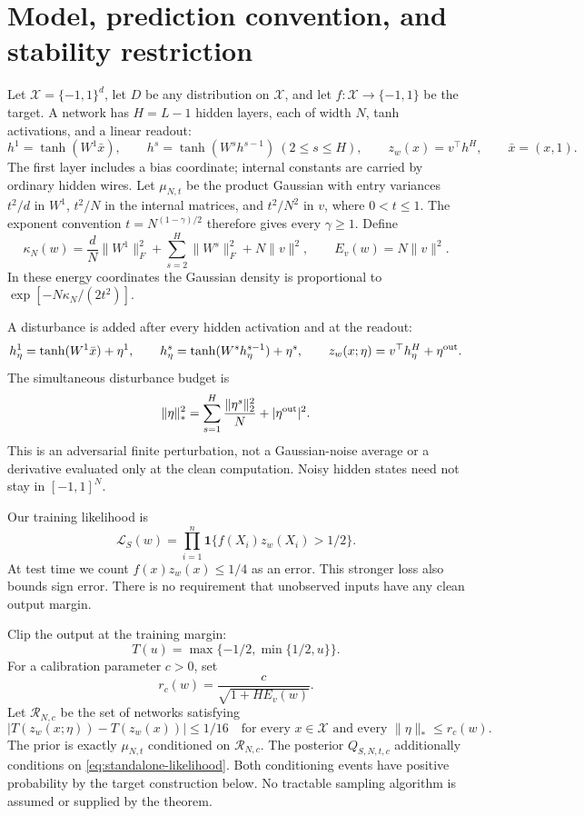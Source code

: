 \section{Model, prediction convention, and stability restriction}
\label{sec:theory-model}

Let $\mathcal X=\{-1,1\}^d$, let $D$ be any distribution on $\mathcal X$,
and let $f:\mathcal X\to\{-1,1\}$ be the target. A network has $H=L-1$
hidden layers, each of width $N$, tanh activations, and a linear readout:
\[
 h^1=\tanh(W^1\bar x),\qquad
 h^s=\tanh(W^s h^{s-1})\ (2\le s\le H),\qquad
 z_w(x)=v^\top h^H,
 \qquad \bar x=(x,1).
\]
The first layer includes a bias coordinate; internal constants are carried
by ordinary hidden wires. Let $\mu_{N,t}$ be the product Gaussian with entry
variances $t^2/d$ in $W^1$, $t^2/N$ in the internal matrices, and $t^2/N^2$
in $v$, where $0<t\le1$. The exponent convention
$t=N^{(1-\gamma)/2}$ therefore gives every $\gamma\ge1$. Define
\[
 \kappa_N(w)=\frac dN\|W^1\|_F^2+
           \sum_{s=2}^H\|W^s\|_F^2+N\|v\|^2,
 \qquad E_v(w)=N\|v\|^2.
\]
In these energy coordinates the Gaussian density is proportional to
$\exp[-N\kappa_N/(2t^2)]$.

A disturbance is added after every hidden activation and at the readout:
\[
 h^1_\eta=\tanh(W^1\bar x)+\eta^1,\qquad
 h^s_\eta=\tanh(W^s h^{s-1}_\eta)+\eta^s,\qquad
 z_w(x;\eta)=v^\top h^H_\eta+\eta^{\rm out}.
\]
The simultaneous disturbance budget is
\begin{equation}\label{eq:standalone-noise}
 \|\eta\|_*^2=\sum_{s=1}^H\frac{\|\eta^s\|_2^2}{N}
                       +|\eta^{\rm out}|^2.
\end{equation}
This is an adversarial finite perturbation, not a Gaussian-noise average or
a derivative evaluated only at the clean computation. Noisy hidden states
need not stay in $[-1,1]^N$.

Our training likelihood is
\begin{equation}\label{eq:standalone-likelihood}
 \mathcal L_S(w)=\prod_{i=1}^n
       \mathbf1\{f(X_i)z_w(X_i)>1/2\}.
\end{equation}
At test time we count $f(x)z_w(x)\le1/4$ as an error. This stronger loss
also bounds sign error. There is no requirement that unobserved inputs have
any clean output margin.

Clip the output at the training margin:
\[
 T(u)=\max\{-1/2,\min\{1/2,u\}\}.
\]
For a calibration parameter $c>0$, set
\begin{equation}\label{eq:standalone-radius}
 r_c(w)=\frac{c}{\sqrt{1+H E_v(w)}}.
\end{equation}
Let $\mathcal R_{N,c}$ be the set of networks satisfying
\begin{equation}\label{eq:standalone-support}
 |T(z_w(x;\eta))-T(z_w(x))|\le1/16
 \quad\text{for every }x\in\mathcal X
 \text{ and every }\|\eta\|_*\le r_c(w).
\end{equation}
The prior is exactly $\mu_{N,t}$ conditioned on $\mathcal R_{N,c}$.
The posterior $Q_{S,N,t,c}$ additionally conditions on
\eqref{eq:standalone-likelihood}. Both conditioning events have positive
probability by the target construction below. No tractable sampling
algorithm is assumed or supplied by the theorem.

